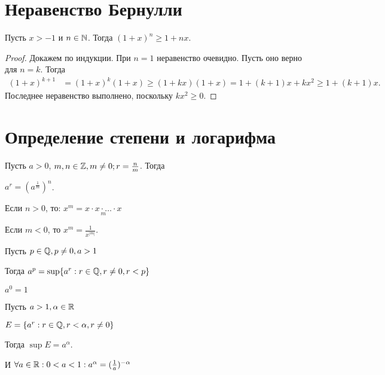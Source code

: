 


\section{Неравенство Бернулли}

\begin{theorem}
    Пусть $x > -1$ и $n \in \mathbb{N}$. Тогда $(1 + x)^n \ge 1 + nx$.

\end{theorem}

\begin{proof}
    Докажем по индукции. При $n = 1$ неравенство очевидно. Пусть оно верно для $n = k$. Тогда
    \begin{align*}
        (1 + x)^{k+1} &= (1 + x)^k (1 + x) \ge (1 + kx)(1 + x) = 1 + (k+1)x + kx^2 \ge 1 + (k+1)x.
    \end{align*}
    Последнее неравенство выполнено, поскольку $kx^2 \ge 0$.
\end{proof}

\section{Определение степени и логарифма}

\begin{definition}
    Пусть $a > 0$, $m, n \in \mathbb{Z}, m \neq 0; r = \frac{n}{m}$. Тогда 
    
    $a^r = (a^{\frac{1}{m}})^n$.

    Если $n > 0$, то: $x^m = \underset{m}{x \cdot x \cdot \ldots \cdot x}$

    Если $m < 0$, то $x^m = \frac{1}{x^{|m|}}$.
\end{definition}


\begin{definition}
    Пусть $p \in \mathbb{Q}, p \neq 0, a > 1$

    Тогда $a^p = \sup\{a^r: r \in \mathbb{Q}, r \neq 0, r < p\}$

    $a^0 = 1$
\end{definition}



\begin{definition}
    Пусть $a > 1, \alpha \in \mathbb{R}$

    $E = \{a^r: r \in \mathbb{Q}, r < \alpha, r \neq 0\}$

    Тогда $\sup E = a^\alpha$.

    И $\forall a \in \mathbb{R}: 0 < a < 1: a^\alpha = (\frac{1}{a})^{-\alpha}$
\end{definition}


